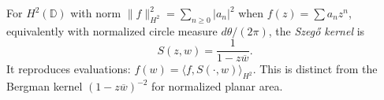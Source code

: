 
For $H^2(\mathbb D)$ with norm $\|f\|_{H^2}^2=\sum_{n\ge0}|a_n|^2$ when $f(z)=\sum a_nz^n$, equivalently with normalized circle measure $d\theta/(2\pi)$, the \emph{Szegő kernel} is
\[
S(z,w)=\frac1{1-z\overline w}.
\]
It reproduces evaluations: $f(w)=\langle f,S(\cdot,w)\rangle_{H^2}$. This is distinct from the Bergman kernel $(1-z\overline w)^{-2}$ for normalized planar area.
